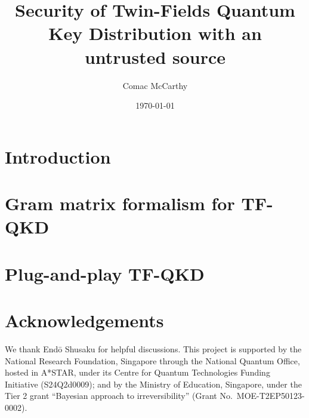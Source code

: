 \documentclass[%
 reprint,
 amsmath,amssymb,
 aps,
]{revtex4-2}
\begin{document}
\title{Security of Twin-Fields Quantum Key Distribution with an untrusted source}

\author{Comac McCarthy}

\date{\today}%

\begin{abstract}

\end{abstract}

\maketitle


\section{Introduction}

\section{Gram matrix formalism for TF-QKD}



\section{Plug-and-play TF-QKD}

\section*{Acknowledgements}
We thank Endō Shusaku for helpful discussions. This project is supported by the National Research Foundation, Singapore through the National Quantum Office, hosted in A*STAR, under its Centre for Quantum Technologies Funding Initiative (S24Q2d0009); and by the Ministry of Education, Singapore, under the Tier 2 grant ``Bayesian approach to irreversibility'' (Grant No.~MOE-T2EP50123-0002).

\appendix
\end{document}
